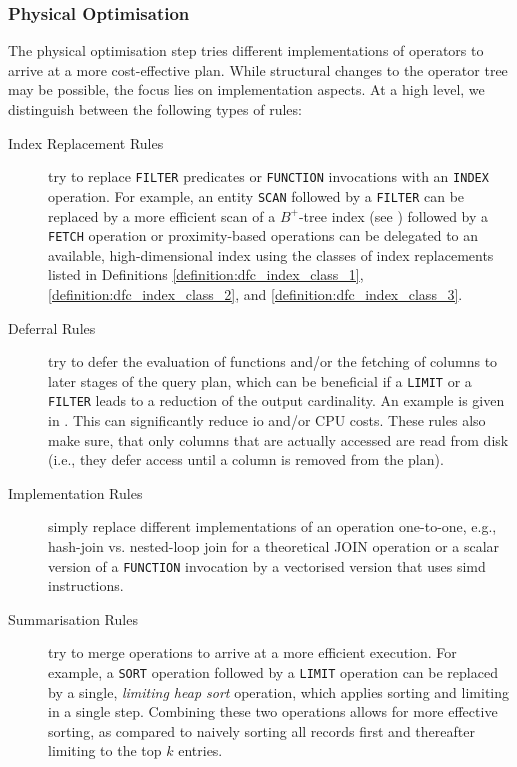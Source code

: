 \subsubsection{Physical Optimisation}

The physical optimisation step tries different implementations of operators to arrive at a more cost-effective plan. While structural changes to the operator tree may be possible, the focus lies on implementation aspects.  At a high level, we distinguish between the following types of rules:

\begin{description}
    \item[Index Replacement Rules] try to replace \texttt{FILTER} predicates or \texttt{FUNCTION} invocations with an  \texttt{INDEX} operation. For example, an entity \texttt{SCAN} followed by a \texttt{FILTER} can be replaced by a more efficient scan of a $B^{+}$-tree index (see ) followed by a \texttt{FETCH} operation or proximity-based operations can be delegated to an available, high-dimensional index using the classes of index replacements listed in Definitions \ref{definition:dfc_index_class_1}, \ref{definition:dfc_index_class_2}, and \ref{definition:dfc_index_class_3}.
 
    \item[Deferral Rules] try to defer the evaluation of functions and/or the fetching of columns to later stages of the query plan, which can be beneficial if a \texttt{LIMIT} or a \texttt{FILTER} leads to a reduction of the output cardinality. An example is given in . This can significantly reduce \acrshort{io} and/or CPU costs. These rules also make sure, that only columns that are actually accessed are read from disk (i.e., they defer access until a column is removed from the plan).

    \item[Implementation Rules] simply replace different implementations of an operation one-to-one, e.g., hash-join vs. nested-loop join for a theoretical JOIN operation or a scalar version of a \texttt{FUNCTION} invocation by a vectorised version that uses \acrshort{simd} instructions.

    \item[Summarisation Rules] try to merge operations to arrive at a more efficient execution. For example, a \texttt{SORT} operation followed by a  \texttt{LIMIT} operation can be replaced by a single, \emph{limiting heap sort} operation, which applies sorting and limiting in a single step. Combining these two operations allows for more effective sorting, as compared to naively sorting all records first and thereafter limiting to the top $k$ entries.
\end{description}


